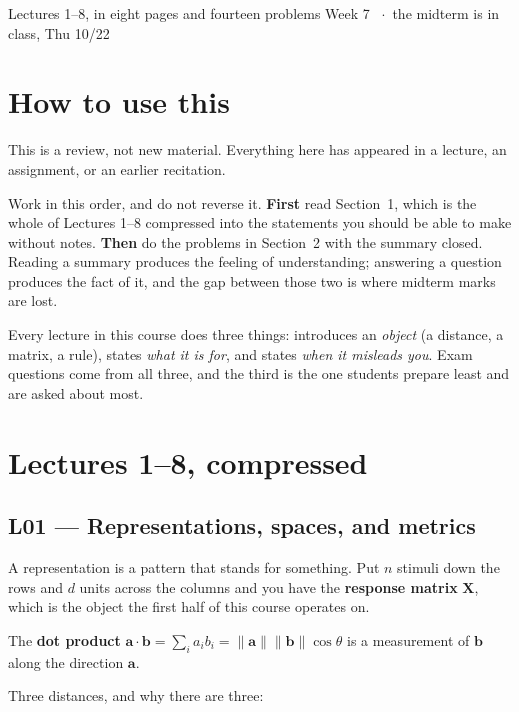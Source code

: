 \documentclass[11pt]{article}
\begin{document}
  {Lectures 1--8, in eight pages and fourteen problems}
  {Week 7 \ $\cdot$\ the midterm is in class, Thu 10/22}

\section*{How to use this}

This is a review, not new material. Everything here has appeared in a lecture,
an assignment, or an earlier recitation.

Work in this order, and do not reverse it. \textbf{First} read Section~1, which
is the whole of Lectures 1--8 compressed into the statements you should be able
to make without notes. \textbf{Then} do the problems in Section~2 with the
summary closed. Reading a summary produces the feeling of understanding;
answering a question produces the fact of it, and the gap between those two is
where midterm marks are lost.

\begin{keybox}
 Every lecture in this course does three things:
introduces an \emph{object} (a distance, a matrix, a rule), states \emph{what
it is for}, and states \emph{when it misleads you}. Exam questions come from all
three, and the third is the one students prepare least and are asked about
most.
\end{keybox}

\section{Lectures 1--8, compressed}

\subsection{L01 --- Representations, spaces, and metrics}

A representation is a pattern that stands for something. Put $n$ stimuli down
the rows and $d$ units across the columns and you have the \textbf{response
matrix} $\boldsymbol{X}$, which is the object the first half of this course
operates on.

The \textbf{dot product} $\boldsymbol{a}\cdot\boldsymbol{b} = \sum_i a_i b_i =
\|\boldsymbol{a}\|\|\boldsymbol{b}\|\cos\theta$ is a measurement of
$\boldsymbol{b}$ along the direction $\boldsymbol{a}$.

Three distances, and why there are three:
\end{document}
